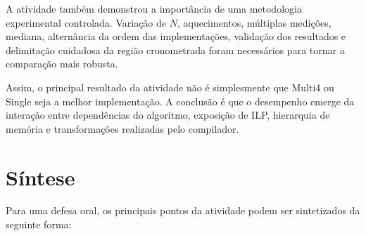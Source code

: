 A atividade também demonstrou a importância de uma metodologia experimental controlada.
Variação de \(N\), aquecimentos, múltiplas medições, mediana, alternância da ordem das
implementações, validação dos resultados e delimitação cuidadosa da região cronometrada foram
necessários para tornar a comparação mais robusta.

Assim, o principal resultado da atividade não é simplesmente que Multi4 ou Single seja a
melhor implementação. A conclusão é que o desempenho emerge da interação entre dependências
do algoritmo, exposição de ILP, hierarquia de memória e transformações realizadas pelo
compilador.


\section{Síntese}

\label{sec:atvd02-defesa}

Para uma defesa oral, os principais pontos da atividade podem ser sintetizados da seguinte
forma:

